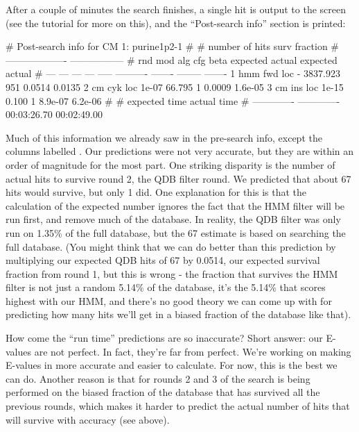 After a couple of minutes the search finishes, a single hit is output
to the screen (see the tutorial for more on this), and the
``Post-search info'' section is printed:

\begin{sreoutput}
# Post-search info for CM 1: purine1p2-1
#
#                              number of hits       surv fraction  
#                            -------------------  -----------------
# rnd  mod  alg  cfg   beta    expected   actual  expected   actual
# ---  ---  ---  ---  -----  ----------  -------  --------  -------
    1  hmm  fwd  loc      -    3837.923      951    0.0514   0.0135
    2   cm  cyk  loc  1e-07      66.795        1    0.0009  1.6e-05
    3   cm  ins  loc  1e-15       0.100        1   8.9e-07  6.2e-06
#
# expected time    actual time
# -------------  -------------
    00:03:26.70    00:02:49.00
\end{sreoutput}

Much of this information we already saw in the pre-search info, except
the columns labelled . Our predictions were not very
accurate, but they are within an order of magnitude for the most
part. One striking disparity is the number of actual hits to survive
round 2, the QDB filter round. We predicted that about 67 hits
would survive, but only 1 did. One explanation for this is
that the calculation of the expected number ignores the fact that the
HMM filter will be run first, and remove much of the database. In
reality, the QDB filter was only run on 1.35\% of the full
database, but the 67 estimate is based on searching the full
database. (You might think that we can do better than this prediction
by multiplying our expected QDB hits of 67 by 0.0514, our expected
survival fraction from round 1, but this is wrong - the fraction that
survives the HMM filter is not just a random 5.14\% of the database,
it's the 5.14\% that scores highest with our HMM, and there's no good
theory we can come up with for predicting how many hits we'll get in a
biased fraction of the database like that).

\begin{srefaq}{How come the  ``run time'' predictions are
  so inaccurate?} Short answer: our E-values are not perfect. In fact,
  they're far from perfect. We're working on making E-values in
   more accurate and easier to calculate. For now,
  this is the best we can do. Another reason is that for rounds 2 and
  3 of  the search is being performed on the biased
  fraction of the database that has survived all the previous rounds,
  which makes it harder to predict the actual number of hits that will
  survive with accuracy (see above).
\end{srefaq}

